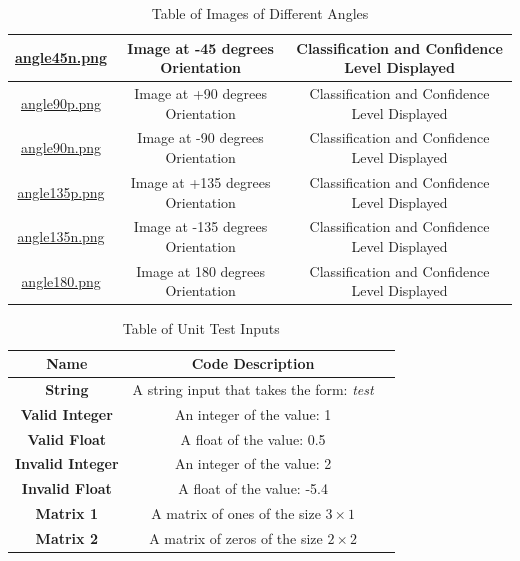 \documentclass[12pt, titlepage]{article}
\begin{document}
\begin{landscape}
\begin{table}[h!]
\begin{tabular}{|c|c|c|}
      \href{https://github.com/cer-hunter/OAR-CAS741/tree/main/tests/test-images/angle45n.png}{angle45n.png} & Image at -45 degrees Orientation & Classification and Confidence Level Displayed\\ \hline
      \href{https://github.com/cer-hunter/OAR-CAS741/tree/main/tests/test-images/angle90p.png}{angle90p.png} & Image at +90 degrees Orientation & Classification and Confidence Level Displayed\\ \hline
      \href{https://github.com/cer-hunter/OAR-CAS741/tree/main/tests/test-images/angle90n.png}{angle90n.png} & Image at -90 degrees Orientation & Classification and Confidence Level Displayed\\ \hline
      \href{https://github.com/cer-hunter/OAR-CAS741/tree/main/tests/test-images/angle135p.png}{angle135p.png} & Image at +135 degrees Orientation & Classification and Confidence Level Displayed\\ \hline
      \href{https://github.com/cer-hunter/OAR-CAS741/tree/main/tests/test-images/angle135n.png}{angle135n.png} & Image at -135 degrees Orientation & Classification and Confidence Level Displayed\\ \hline
      \href{https://github.com/cer-hunter/OAR-CAS741/tree/main/tests/test-images/angle180.png}{angle180.png} & Image at 180 degrees Orientation & Classification and Confidence Level Displayed\\ \hline
    \end{tabular}
    \caption{Table of Images of Different Angles}
    \label{table_angle}
  \end{table}
\end{landscape}

\begin{table}[h!]
  \centering
  \begin{tabular}{|c|c|c|}
    \hline
    \textbf{Name} & \textbf{Code Description} \\ \hline
    \textbf{String} & A string input that takes the form: \textit{test} \\ \hline
    \textbf{Valid Integer} & An integer of the value: 1 \\ \hline
    \textbf{Valid Float} & A float of the value: 0.5 \\ \hline
    \textbf{Invalid Integer} & An integer of the value: 2 \\ \hline
    \textbf{Invalid Float} & A float of the value: -5.4 \\ \hline
    \textbf{Matrix 1} & A matrix of ones of the size $3 \times 1$ \\ \hline
    \textbf{Matrix 2} & A matrix of zeros of the size $2 \times 2$ \\ \hline
    
  \end{tabular}
  \caption{Table of Unit Test Inputs}
  \label{table_unittest}
\end{table}
\end{document}
